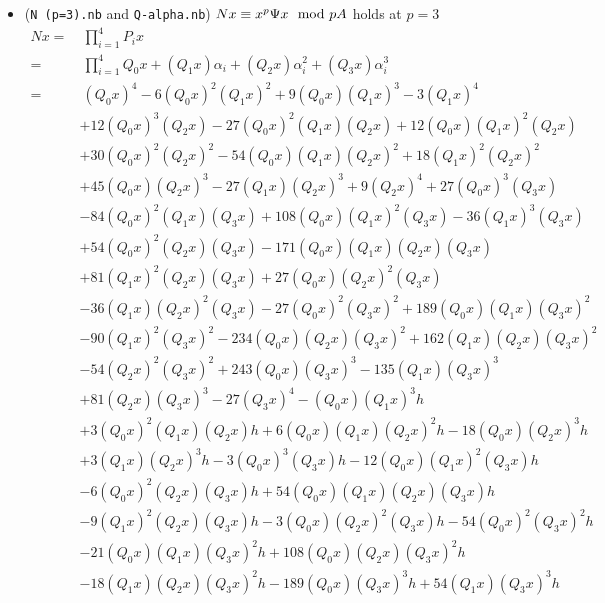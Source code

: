 \documentclass{rs}
\theoremstyle{definition}
\theoremstyle{remark}
\newcommand{\md}{~~{\rm mod}~}
\newcommand{\A}{\alpha}
\renewcommand{\=}{\approx}
\renewcommand{\-}{\sim}
\numberwithin{equation}{section}
\numberwithin{thm}{section}
\begin{document}
\begin{enumerate}
\begin{itemize}
  \item (\texttt{N (p=3).nb} and \texttt{Q-alpha.nb}) $N x \equiv x^p \Psi x \md p A$ holds at $p = 3$ 
  \begin{equation*}
  \begin{split}
   N x = & ~ \prod_{i=1}^4 P_i x \\
       = & ~ \prod_{i=1}^4 Q_0 x + (Q_1 x) \A_i + (Q_2 x) \A_i^2 + (Q_3 x) \A_i^3 \\
       = & ~ (Q_0 x)^4 - 6 (Q_0 x)^2 (Q_1 x)^2 + 9 (Q_0 x) (Q_1 x)^3 - 3 (Q_1 x)^4 \\
         & + 12 (Q_0 x)^3 (Q_2 x) - 27 (Q_0 x)^2 (Q_1 x) (Q_2 x) + 12 (Q_0 x) (Q_1 x)^2 (Q_2 x) \\
         & + 30 (Q_0 x)^2 (Q_2 x)^2 - 54 (Q_0 x) (Q_1 x) (Q_2 x)^2 + 18 (Q_1 x)^2 (Q_2 x)^2 \\
         & + 45 (Q_0 x) (Q_2 x)^3 - 27 (Q_1 x) (Q_2 x)^3 + 9 (Q_2 x)^4 + 27 (Q_0 x)^3 (Q_3 x) \\
         & - 84 (Q_0 x)^2 (Q_1 x) (Q_3 x) + 108 (Q_0 x) (Q_1 x)^2 (Q_3 x) - 36 (Q_1 x)^3 (Q_3 x) \\
         & + 54 (Q_0 x)^2 (Q_2 x) (Q_3 x) - 171 (Q_0 x) (Q_1 x) (Q_2 x) (Q_3 x) \\
         & + 81 (Q_1 x)^2 (Q_2 x) (Q_3 x) + 27 (Q_0 x) (Q_2 x)^2 (Q_3 x) \\
         & - 36 (Q_1 x) (Q_2 x)^2 (Q_3 x) - 27 (Q_0 x)^2 (Q_3 x)^2 + 189 (Q_0 x) (Q_1 x) (Q_3 x)^2 \\
         & - 90 (Q_1 x)^2 (Q_3 x)^2 - 234 (Q_0 x) (Q_2 x) (Q_3 x)^2 + 162 (Q_1 x) (Q_2 x) (Q_3 x)^2 \\
         & - 54 (Q_2 x)^2 (Q_3 x)^2 + 243 (Q_0 x) (Q_3 x)^3 - 135 (Q_1 x) (Q_3 x)^3 \\
         & + 81 (Q_2 x) (Q_3 x)^3 - 27 (Q_3 x)^4 - (Q_0 x) (Q_1 x)^3 h \\
         & + 3 (Q_0 x)^2 (Q_1 x) (Q_2 x) h + 6 (Q_0 x) (Q_1 x) (Q_2 x)^2 h - 18 (Q_0 x) (Q_2 x)^3 h \\
         & + 3 (Q_1 x) (Q_2 x)^3 h - 3 (Q_0 x)^3 (Q_3 x) h - 12 (Q_0 x) (Q_1 x)^2 (Q_3 x) h \\
         & - 6 (Q_0 x)^2 (Q_2 x) (Q_3 x) h + 54 (Q_0 x) (Q_1 x) (Q_2 x) (Q_3 x) h \\
         & - 9 (Q_1 x)^2 (Q_2 x) (Q_3 x) h - 3 (Q_0 x) (Q_2 x)^2 (Q_3 x) h - 54 (Q_0 x)^2 (Q_3 x)^2 h \\
         & - 21 (Q_0 x) (Q_1 x) (Q_3 x)^2 h + 108 (Q_0 x) (Q_2 x) (Q_3 x)^2 h \\
         & - 18 (Q_1 x) (Q_2 x) (Q_3 x)^2 h - 189 (Q_0 x) (Q_3 x)^3 h + 54 (Q_1 x) (Q_3 x)^3 h \\

\end{split}
\end{equation*}
\end{itemize}
\end{enumerate}
\end{document}
